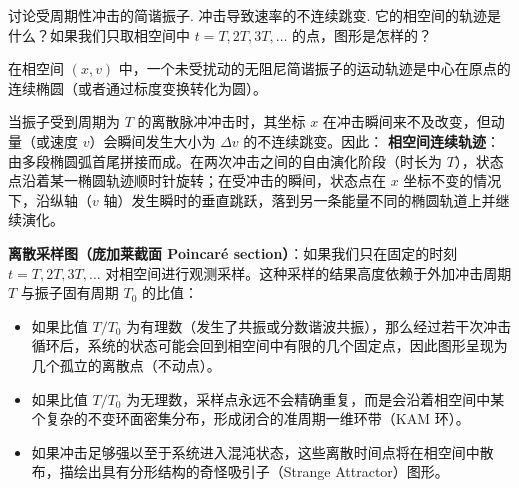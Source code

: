 \begin{exercise}\label{ex:2.12}
讨论受周期性冲击的简谐振子. 冲击导致速率的不连续跳变. 它的相空间的轨迹是什么？如果我们只取相空间中 $t=T, 2T, 3T, \dots$ 的点，图形是怎样的？
\end{exercise}
\begin{solution}
在相空间 $(x, v)$ 中，一个未受扰动的无阻尼简谐振子的运动轨迹是中心在原点的连续椭圆（或者通过标度变换转化为圆）。

当振子受到周期为 $T$ 的离散脉冲冲击时，其坐标 $x$ 在冲击瞬间来不及改变，但动量（或速度 $v$）会瞬间发生大小为 $\Delta v$ 的不连续跳变。因此：
\textbf{相空间连续轨迹}：由多段椭圆弧首尾拼接而成。在两次冲击之间的自由演化阶段（时长为 $T$），状态点沿着某一椭圆轨迹顺时针旋转；在受冲击的瞬间，状态点在 $x$ 坐标不变的情况下，沿纵轴（$v$ 轴）发生瞬时的垂直跳跃，落到另一条能量不同的椭圆轨道上并继续演化。

\textbf{离散采样图（庞加莱截面 Poincaré section）}：如果我们只在固定的时刻 $t=T, 2T, 3T, \dots$ 对相空间进行观测采样。这种采样的结果高度依赖于外加冲击周期 $T$ 与振子固有周期 $T_0$ 的比值：
\begin{itemize}
    \item 如果比值 $T/T_0$ 为有理数（发生了共振或分数谐波共振），那么经过若干次冲击循环后，系统的状态可能会回到相空间中有限的几个固定点，因此图形呈现为几个孤立的离散点（不动点）。
    \item 如果比值 $T/T_0$ 为无理数，采样点永远不会精确重复，而是会沿着相空间中某个复杂的不变环面密集分布，形成闭合的准周期一维环带（KAM 环）。
    \item 如果冲击足够强以至于系统进入混沌状态，这些离散时间点将在相空间中散布，描绘出具有分形结构的奇怪吸引子（Strange Attractor）图形。
\end{itemize}
\end{solution}


